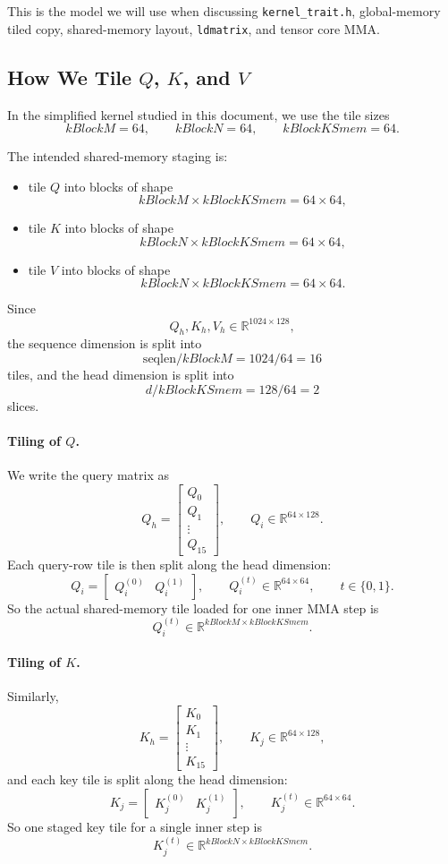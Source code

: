 \documentclass[11pt]{article}
\newcommand{\R}{\mathbb{R}}
\begin{document}
This is the model we will use when discussing \texttt{kernel\_trait.h},
global-memory tiled copy, shared-memory layout, \texttt{ldmatrix}, and tensor
core MMA.

\subsection{How We Tile \texorpdfstring{$Q$, $K$, and $V$}{Q, K, and V}}

In the simplified kernel studied in this document, we use the tile sizes
\[
kBlockM = 64, \qquad kBlockN = 64, \qquad kBlockKSmem = 64.
\]

The intended shared-memory staging is:
\begin{itemize}
    \item tile $Q$ into blocks of shape
    \[
    kBlockM \times kBlockKSmem = 64 \times 64,
    \]
    \item tile $K$ into blocks of shape
    \[
    kBlockN \times kBlockKSmem = 64 \times 64,
    \]
    \item tile $V$ into blocks of shape
    \[
    kBlockN \times kBlockKSmem = 64 \times 64.
    \]
\end{itemize}

Since
\[
Q_h, K_h, V_h \in \R^{1024 \times 128},
\]
the sequence dimension is split into
\[
\mathrm{seqlen} / kBlockM = 1024 / 64 = 16
\]
tiles, and the head dimension is split into
\[
d / kBlockKSmem = 128 / 64 = 2
\]
slices.

\paragraph{Tiling of $Q$.}
We write the query matrix as
\[
Q_h =
\begin{bmatrix}
Q_0 \\
Q_1 \\
\vdots \\
Q_{15}
\end{bmatrix},
\qquad
Q_i \in \R^{64 \times 128}.
\]
Each query-row tile is then split along the head dimension:
\[
Q_i = \begin{bmatrix} Q_i^{(0)} & Q_i^{(1)} \end{bmatrix},
\qquad
Q_i^{(t)} \in \R^{64 \times 64},
\qquad
t \in \{0,1\}.
\]
So the actual shared-memory tile loaded for one inner MMA step is
\[
Q_i^{(t)} \in \R^{kBlockM \times kBlockKSmem}.
\]

\paragraph{Tiling of $K$.}
Similarly,
\[
K_h =
\begin{bmatrix}
K_0 \\
K_1 \\
\vdots \\
K_{15}
\end{bmatrix},
\qquad
K_j \in \R^{64 \times 128},
\]
and each key tile is split along the head dimension:
\[
K_j = \begin{bmatrix} K_j^{(0)} & K_j^{(1)} \end{bmatrix},
\qquad
K_j^{(t)} \in \R^{64 \times 64}.
\]
So one staged key tile for a single inner step is
\[
K_j^{(t)} \in \R^{kBlockN \times kBlockKSmem}.
\]
\end{document}
